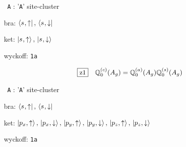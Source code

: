 \documentclass[fleqn,10pt,landscape]{jsarticle}
\begin{document}
\vspace{5mm}

\noindent\textbullet\, \texttt{A} : '\texttt{A}' site-cluster

\noindent\quad * bra: $\bra{s_{},\uparrow},\, \bra{s_{},\downarrow}$

\noindent\quad * ket: $\ket{s_{},\uparrow},\, \ket{s_{},\downarrow}$

\noindent\quad * wyckoff: \texttt{1a}

\begin{dmath*}
\hspace*{3mm}\fbox{z1}\quad \mathbb{Q}_{0}^{(c)}(A_{g})=\mathbb{Q}_{0}^{(a)}(A_{g}) \mathbb{Q}_{0}^{(s)}(A_{g})
\end{dmath*}
\vspace{5mm}

\noindent\textbullet\, \texttt{A} : '\texttt{A}' site-cluster

\noindent\quad * bra: $\bra{s_{},\uparrow},\, \bra{s_{},\downarrow}$

\noindent\quad * ket: $\ket{p_{x},\uparrow},\, \ket{p_{x},\downarrow},\, \ket{p_{y},\uparrow},\, \ket{p_{y},\downarrow},\, \ket{p_{z},\uparrow},\, \ket{p_{z},\downarrow}$

\noindent\quad * wyckoff: \texttt{1a}
\end{document}
